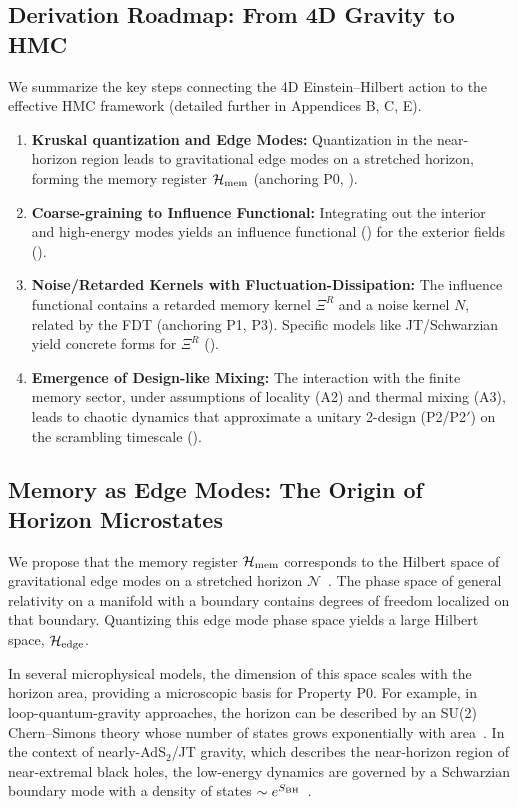 \documentclass[a4paper,11pt]{article}
\newcommand{\HMC}{\textsc{HMC}\xspace}
\theoremstyle{plain}
\theoremstyle{definition}
\theoremstyle{remark}
\begin{document}
\subsection{Derivation Roadmap: From 4D Gravity to HMC}
\label{sec:derivation_roadmap}
We summarize the key steps connecting the 4D Einstein--Hilbert action to the effective \HMC{} framework (detailed further in Appendices B, C, E).

\begin{enumerate}[label=(\roman*)]
    \item \textbf{Kruskal quantization and Edge Modes:} Quantization in the near-horizon region leads to gravitational edge modes on a stretched horizon, forming the memory register $\mathcal{H}_{\rm mem}$ (anchoring P0, ).
    \item \textbf{Coarse-graining to Influence Functional:} Integrating out the interior and high-energy modes yields an influence functional () for the exterior fields ().
    \item \textbf{Noise/Retarded Kernels with Fluctuation-Dissipation:} The influence functional contains a retarded memory kernel $\Xi^R$ and a noise kernel $N$, related by the FDT (anchoring P1, P3). Specific models like JT/Schwarzian yield concrete forms for $\Xi^R$ ().
    \item \textbf{Emergence of Design-like Mixing:} The interaction with the finite memory sector, under assumptions of locality (A2) and thermal mixing (A3), leads to chaotic dynamics that approximate a unitary 2-design (P2/P2$'$) on the scrambling timescale ().
\end{enumerate}

\subsection{Memory as Edge Modes: The Origin of Horizon Microstates}
\label{sec:microstates}
We propose that the memory register $\mathcal{H}_{\rm mem}$ corresponds to the Hilbert space of gravitational edge modes on a stretched horizon $\mathcal{N}$~\cite{tHooft:1985, Susskind:1993, Donnelly:2016, Carlip:2017, HopfmullerFreidel:2018}. The phase space of general relativity on a manifold with a boundary contains degrees of freedom localized on that boundary. Quantizing this edge mode phase space yields a large Hilbert space, $\mathcal{H}_{\rm edge}$.

In several microphysical models, the dimension of this space scales with the horizon area, providing a microscopic basis for Property P0. For example, in loop-quantum-gravity approaches, the horizon can be described by an SU(2) Chern--Simons theory whose number of states grows exponentially with area~\cite{Ashtekar:1998, Engle:2010}. In the context of nearly-AdS$_2$/JT gravity, which describes the near-horizon region of near-extremal black holes, the low-energy dynamics are governed by a Schwarzian boundary mode with a density of states $\sim e^{S_{\rm BH}}$~\cite{Almheiri:2015, Maldacena:2016SYK, MSY:2016, Jensen:2016}.
\end{document}
